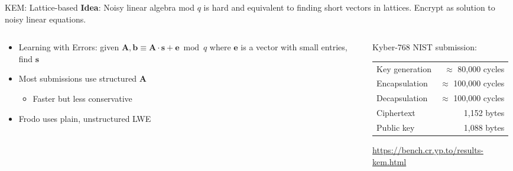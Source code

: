 \documentclass[xcolor=table,10pt,aspectratio=169]{beamer}
\begin{document}
\begin{frame}[label={sec:org995c0e5}]{KEM: Lattice-based}
\textbf{Idea}: Noisy linear algebra mod \(q\) is hard and equivalent to finding short vectors in lattices. Encrypt as solution to noisy linear equations.

\begin{columns}[t]
\begin{column}{0.5\columnwidth}
\begin{itemize}
\item Learning with Errors: given \(\mathbf{A}, \mathbf{b} \equiv \mathbf{A} \cdot \mathbf{s} + \mathbf{e} \bmod q\) where \(\mathbf{e}\) is a vector with small entries, find \(\mathbf{s}\)
\item Most submissions use structured \(\mathbf{A}\)
\begin{itemize}
\item Faster but less conservative
\end{itemize}
\item Frodo uses plain, unstructured LWE
\end{itemize}
\end{column}

\begin{column}{0.5\columnwidth}
Kyber-768 NIST submission:

\begin{center}
\begin{tabular}{lr}
Key generation & \(\approx\)  80,000 cycles\\
Encapsulation & \(\approx\) 100,000 cycles\\
Decapsulation & \(\approx\) 100,000 cycles\\
Ciphertext & 1,152 bytes\\
Public key & 1,088 bytes\\
\end{tabular}

\end{center}

\small \url{https://bench.cr.yp.to/results-kem.html}
\end{column}
\end{columns}
\end{frame}
\end{document}
